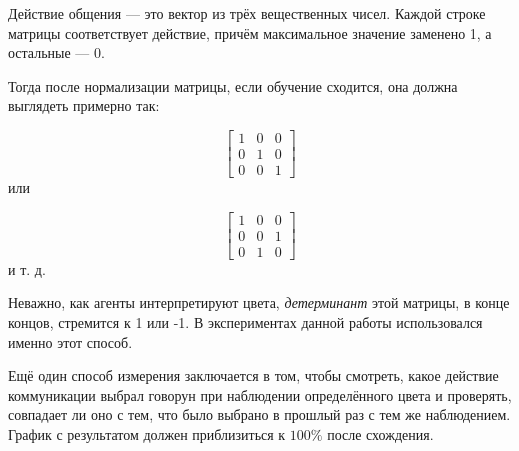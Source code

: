 Действие общения --- это вектор из трёх вещественных чисел. Каждой строке матрицы соответствует действие, причём максимальное значение заменено 1, а остальные --- 0.

Тогда после нормализации матрицы, если обучение сходится, она должна выглядеть примерно так:

\begin{equation*}
    \begin{bmatrix}
        1 & 0 & 0 \\
        0 & 1 & 0 \\
        0 & 0 & 1
    \end{bmatrix}
\end{equation*}
или

\begin{equation*}
    \begin{bmatrix}
        1 & 0 & 0 \\
        0 & 0 & 1 \\
        0 & 1 & 0
    \end{bmatrix}
\end{equation*}
и т. д.

Неважно, как агенты интерпретируют цвета, \textit{детерминант} этой матрицы, в конце концов, стремится к 1 или -1. В экспериментах данной работы использовался именно этот способ.

Ещё один способ измерения заключается в том, чтобы смотреть, какое действие коммуникации выбрал говорун при наблюдении определённого цвета и проверять, совпадает ли оно с тем, что было выбрано в прошлый раз с тем же наблюдением. График с результатом должен приблизиться к $100\%$ после схождения.


